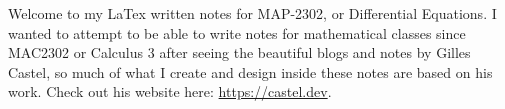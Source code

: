 Welcome to my LaTex written notes for MAP-2302, or Differential Equations. I wanted to attempt to be able to write notes for mathematical classes since MAC2302 or Calculus 3 after seeing the beautiful blogs and notes by Gilles Castel, so much of what I create and design inside these notes are based on his work. Check out his website here: \href{https://castel.dev}{https://castel.dev}.